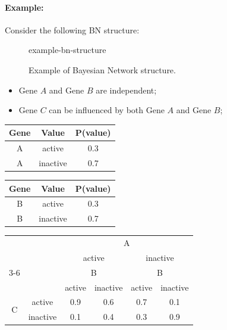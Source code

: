 \paragraph{Example:}
Consider the following BN structure:
\begin{figure}[H]
\centering
    {example-bn-structure}
    \caption{Example of Bayesian Network structure.}
\end{figure}
\begin{itemize}
    \item Gene $A$ and Gene $B$ are independent;
    \item Gene $C$ can be influenced by both Gene $A$ and Gene $B$;
\end{itemize}
\begin{center}
    \begin{minipage}{0.4\textwidth}
        \centering
        \begin{tabular}{c|c|c}
            Gene &  Value & P(value)\\ 
            \hline
            A & active   & 0.3\\
            A & inactive & 0.7\\
        \end{tabular}
        \label{tab:cpdGeneA}
    \end{minipage}
    \hfill
    \begin{minipage}{0.4\textwidth}
    \centering
        \begin{tabular}{c|c|c}
            Gene &  Value & P(value)\\ 
            \hline
            B & active   & 0.3\\
            B & inactive & 0.7\\
        \end{tabular}
        \label{tab:cpdGeneB}
    \end{minipage}
\end{center}

\begin{center}
\begin{tabular}{|c|c|cc|cc|}
\hline
 & & \multicolumn{4}{c|}{A} \\
 & & \multicolumn{2}{c|}{active} & \multicolumn{2}{c|}{inactive} \\
\cline{3-6}
 & & \multicolumn{2}{c|}{B} & \multicolumn{2}{c|}{B} \\
 & & active & inactive & active & inactive \\
\hline
\multirow{2}{*}{C}
 & active   & 0.9 & 0.6 & 0.7 & 0.1 \\
 & inactive & 0.1 & 0.4 & 0.3 & 0.9 \\
\hline
\end{tabular}
\end{center}

